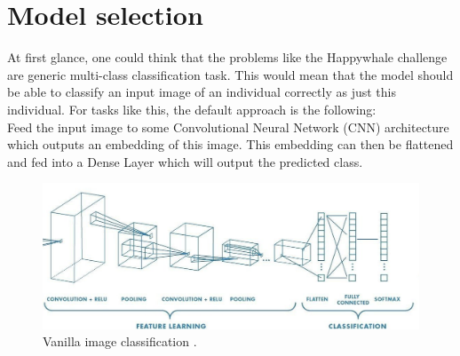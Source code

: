 \section{Model selection}
\label{sec:model_selection}

At first glance, one could think that the problems like the Happywhale challenge are generic multi-class classification task. This would mean that the model should be able to classify an input image of an individual correctly as just this individual. For tasks like this, the default approach is the following: \\
Feed the input image to some Convolutional Neural Network (CNN) architecture which outputs an embedding of this image. This embedding can then be flattened and fed into a Dense Layer which will output the predicted class. \cite{CNN-Courseware}

\begin{figure}[ht] 
        \centering \includegraphics[width=1\columnwidth]{figures/cnn.jpeg}
        \caption{\label{fig:cnn_architecture_img} Vanilla image classification \protect\cite{cnn_architecture_img}.}
\end{figure}

